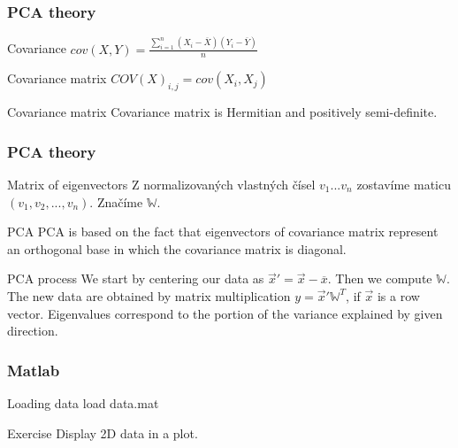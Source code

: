 \documentclass{beamer}
\begin{document}
\begin{frame}
\frametitle{PCA theory}

\begin{block}{Covariance}
$cov (X, Y) = \frac{\sum_{i=1}^n (X_i - \overline{X})(Y_i - \overline{Y})}{n}$
\end{block}

\begin{block}{Covariance matrix}
$COV(X)_{i,j} = cov(X_i, X_j)$
\end{block}

\begin{block}{Covariance matrix}
Covariance matrix is Hermitian and positively semi-definite.
\end{block}
\end{frame}



\begin{frame}
\frametitle{PCA theory}

\begin{block}{Matrix of eigenvectors}
Z normalizovaných vlastných čísel $v_1 ... v_n$ zostavíme maticu $(v_1, v_2, ... , v_n)$. Značíme $\mathbb{W}$.
\end{block}

\begin{block}{PCA}
PCA is based on the fact that eigenvectors of covariance matrix represent an orthogonal base in which the covariance matrix is diagonal.
\end{block}

\begin{block}{PCA process}
We start by centering our data as $\vec{x}' = \vec{x} - \overline{x}$. Then we compute $\mathbb{W}$. The new data are obtained by matrix multiplication $ y = \vec{x}' \mathbb{W}^T$, if $\vec{x}$ is a row vector. Eigenvalues correspond to the portion of the variance explained by given direction.
\end{block}
\end{frame}



\begin{frame}
\frametitle{Matlab}

\begin{block}{Loading data}
load data.mat
\end{block}

\begin{block}{Exercise}
Display 2D data in a plot.
\end{block}

\end{frame}
\end{document}
